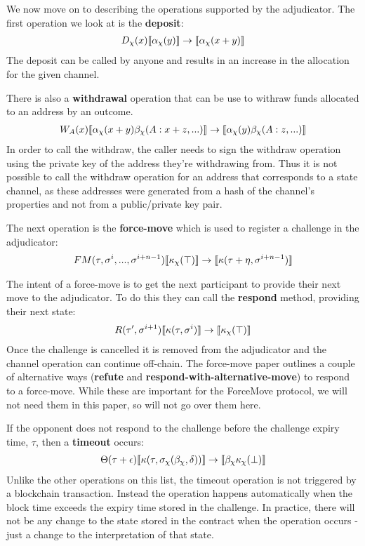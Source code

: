 We now move on to describing the operations supported by the adjudicator. The first operation we look at is the \textbf{deposit}:
\begin{align*}
D_\chi(x) \llbracket \alpha_\chi(y) \rrbracket \rightarrow \llbracket \alpha_\chi(x + y) \rrbracket
\end{align*}
The deposit can be called by anyone and results in an increase in the allocation for the given channel.

There is also a \textbf{withdrawal} operation that can be use to withraw funds allocated to an address by an outcome.
\begin{align*}
W_A(x) \llbracket \alpha_\chi(x + y)\beta_\chi(A: x + z, ...) \rrbracket \rightarrow \llbracket \alpha_\chi(y)\beta_\chi(A: z, ...) \rrbracket
\end{align*}
In order to call the withdraw, the caller needs to sign the withdraw operation using the private key of the address they're withdrawing from. Thus it is not possible to call the withdraw operation for an address that corresponds to a state channel, as these addresses were generated from a hash of the channel's properties and not from a public/private key pair.

The next operation is the \textbf{force-move} which is used to register a challenge in the adjudicator:
\begin{align*}
FM(\tau, \sigma^i, ..., \sigma^{i+n-1}) \llbracket \kappa_\chi(\top) \rrbracket \rightarrow \llbracket \kappa(\tau + \eta, \sigma^{i+n-1}) \rrbracket
\end{align*}

The intent of a force-move is to get the next participant to provide their next move to the adjudicator. To do this they can call the \textbf{respond} method, providing their next state:
\begin{align*}
R(\tau', \sigma^{i+1})\llbracket \kappa(\tau, \sigma^i) \rrbracket \rightarrow \llbracket \kappa_\chi(\top) \rrbracket
\end{align*}
Once the challenge is cancelled it is removed from the adjudicator and the channel operation can continue off-chain. The force-move paper \cite{} outlines a couple of alternative ways (\textbf{refute} and \textbf{respond-with-alternative-move}) to respond to a force-move. While these are important for the ForceMove protocol, we will not need them in this paper, so will not go over them here.

If the opponent does not respond to the challenge before the challenge expiry time, $\tau$, then a \textbf{timeout} occurs:
\begin{align*}
\Theta(\tau + \epsilon) \llbracket \kappa(\tau, \sigma_\chi(\beta_\chi, \delta)) \rrbracket \rightarrow \llbracket \beta_\chi \kappa_\chi(\bot) \rrbracket
\end{align*}
Unlike the other operations on this list, the timeout operation is not triggered by a
blockchain transaction. Instead the operation happens automatically when the block time
exceeds the expiry time stored in the challenge. In practice, there will not be any change 
to the state stored in the contract when the operation occurs - just a change to the
interpretation of that state. 

